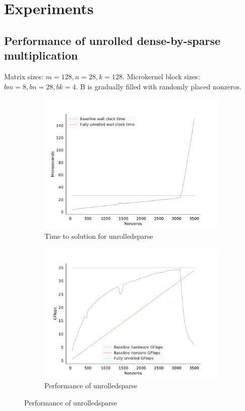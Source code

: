 
\chapter{Experiments}
\label{chapter:experiments}


\section{Performance of unrolled dense-by-sparse multiplication}

  Matrix sizes: $m=128, n=28, k=128$.
  Microkernel block sizes: $bm=8, bn=28, bk=4$.
  B is gradually filled with randomly placed nonzeros.

  \begin{figure}[!htb]
  	\centering
    \begin{subfigure}[b]{0.4\textwidth}
      \centering
      \includegraphics[width=\textwidth]{images/fig2.pdf}
      \caption{Time to solution for unrolledsparse}
      \label{fig:unrolled_time}
    \end{subfigure}
    \begin{subfigure}[b]{0.4\textwidth}
      \centering
      \includegraphics[width=\textwidth]{images/fig3.pdf}
      \caption{Performance of unrolledsparse}
      \label{fig:unrolled_perf}
    \end{subfigure}
  \end{figure}

